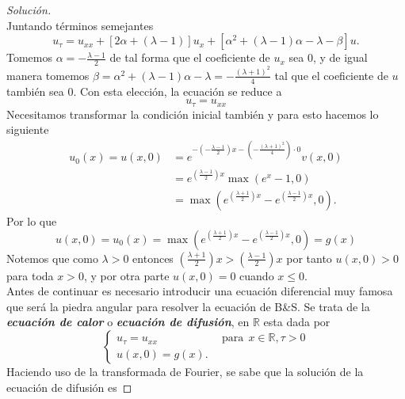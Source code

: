 \documentclass[11pt,notitlepage]{article}
\newenvironment{solucion}
  {\begin{proof}[Solución]}
  {\end{proof}}
\begin{document}
\begin{solucion}
\begin{equation*}
    \end{equation*}
    Juntando términos semejantes
    \begin{equation*}
        u_\tau = u_{xx} + [2\alpha + (\lambda - 1)]u_x + [\alpha^2 + (\lambda - 1)\alpha - \lambda - \beta]u.
    \end{equation*}
    Tomemos $\alpha = -\frac{\lambda - 1}{2}$ de tal forma que el coeficiente de $u_x$ sea 0, y de igual manera tomemos $ \beta = \alpha^2 + (\lambda - 1)\alpha - \lambda = - \frac{(\lambda + 1)^2}{4}$ tal que el coeficiente de $u$ también sea 0. Con esta elección, la ecuación se reduce a
    \begin{equation}
        \label{eq:c1}
        u_\tau = u_{xx}
    \end{equation}
    Necesitamos transformar la condición inicial también y para esto hacemos lo siguiente
    \begin{align*}
        u_0 (x) = u(x,0) &= e^{-(-\frac{\lambda - 1}{2})x -(-\frac{(\lambda + 1)^2}{4})\cdot 0} v (x,0)\\
        &= e^{\left(\frac{\lambda - 1}{2}\right)x} \max (e^x -1, 0)\\ &= \max\left(e^{\left(\frac{\lambda + 1}{2}\right)x} - e^{\left(\frac{\lambda -1 }{2}\right)x}, 0\right).
    \end{align*}
    Por lo que
    \begin{equation}
        \label{eq:c2}
        u(x,0) = u_0(x) = \max\left(e^{\left(\frac{\lambda + 1}{2}\right)x} - e^{\left(\frac{\lambda -1 }{2}\right)x}, 0\right) = g(x)
    \end{equation}
    Notemos que como $ \lambda > 0 $ entonces $ \left(\frac{\lambda + 1}{2}\right) x > \left(\frac{\lambda - 1}{2}\right) x$ por tanto $ u(x,0) > 0 $ para toda $ x > 0$, y por otra parte $ u(x,0) = 0 $ cuando $ x \leq 0 $.\\
    Antes de continuar es necesario introducir una ecuación diferencial muy famosa que será la piedra angular para resolver la ecuación de B\&S. Se trata de la \textbf{\textit{ecuación de calor}} o \textbf{\textit{ecuación de difusión}}, en $\mathbb{R}$ esta dada por
    \begin{equation*}
    \begin{cases}
        u_\tau = u_{xx}& \ \ \mbox{para}\ \ x \in \mathbb{R}, \tau > 0 \\
        u(x,0) = g(x).
    \end{cases}
    \end{equation*}
    Haciendo uso de la transformada de Fourier, se sabe que la solución de la ecuación de difusión es

\end{solucion}
\end{document}
